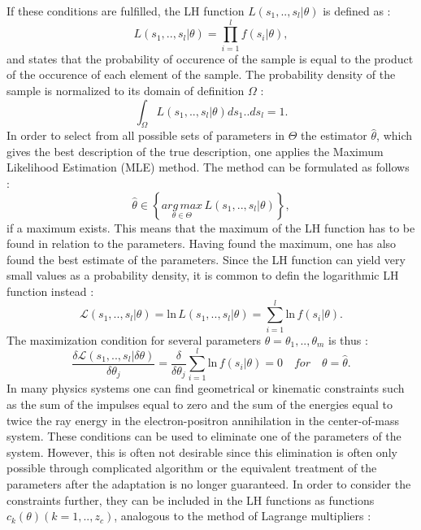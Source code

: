 If these conditions are fulfilled, the LH function $L\left(s_1,..,s_l|\theta \right)$ is defined as :
%
\begin{equation}
  L\left(s_1,..,s_l|\theta \right) = \prod_{i=1}^{l} f(s_i|\theta),
\end{equation}
%
and states that the probability of occurence of the sample is equal to the product of the occurence of each element of the sample. The probability density of the sample is normalized to its domain of definition $\Omega$ :
%
\begin{equation}
  \int_{\Omega} L\left(s_1,..,s_l|\theta \right) ds_1 .. ds_l = 1.
\end{equation}
%
In order to select from all possible sets of parameters in $\Theta$ the estimator $\hat{\theta}$, which gives the best description of the true description, one applies the Maximum Likelihood Estimation (MLE) method. The method can be formulated as follows :
%
\begin{equation}
  \hat{\theta} \in \left \{ \underset{\theta \in \Theta}{arg\,max}\,L\left(s_1,..,s_l|\theta \right) \right \},
\end{equation}
%
if a maximum exists. This means that the maximum of the LH function has to be found in relation to the parameters. Having found the maximum, one has also found the best estimate of the parameters. Since the LH function can yield very small values as a probability density, it is common to defin the logarithmic LH function instead :
%
\begin{equation}
  \mathscr{L}\left(s_1,..,s_l|\theta \right) = \text{ln}\,L\left(s_1,..,s_l|\theta \right) = \sum_{i=1}^{l} \text{ln}\,f(s_i|\theta).
\end{equation}
%
The maximization condition for several parameters $\theta = \theta_1,..,\theta_m$ is thus :
%
\begin{equation}\label{eq:maximization}
  \frac{\delta \mathscr{L}\left(s_1,..,s_l|\delta\theta \right)}{\delta\theta_j} = \frac{\delta}{\delta\theta_j} \sum_{i=1}^{l} \text{ln}\,f(s_i|\theta) = 0 \quad for \quad \theta = \hat{\theta}.
\end{equation}
%
In many physics systems one can find geometrical or kinematic constraints such as the sum of the impulses equal to zero and the sum of the energies equal to twice the ray energy in the electron-positron annihilation in the center-of-mass system. These conditions can be used to eliminate one of the parameters of the system. However, this is often not desirable since this elimination is often only possible through complicated algorithm or the equivalent treatment of the parameters after the adaptation is no longer guaranteed. In order to consider the constraints further, they can be included in the LH functions as functions $c_{k}(\theta)(k=1,..,z_c)$, analogous to the method of Lagrange multipliers :
